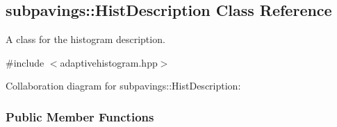 \hypertarget{classsubpavings_1_1HistDescription}{\subsection{subpavings\-:\-:\-Hist\-Description \-Class \-Reference}
\label{classsubpavings_1_1HistDescription}
}


\-A class for the histogram description.  




{\ttfamily \#include $<$adaptivehistogram.\-hpp$>$}



\-Collaboration diagram for subpavings\-:\-:\-Hist\-Description\-:
\subsubsection*{\-Public \-Member \-Functions}
